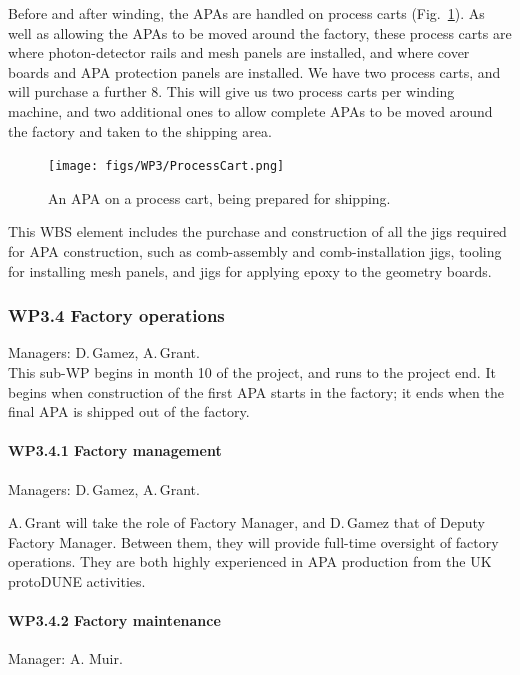 Before and after winding, the APAs are handled on process carts (Fig.~\ref{fig:ProcessCart}). As well as allowing the APAs to be moved around the factory, these process carts are where photon-detector rails and mesh panels are installed, and where cover boards and APA protection panels are installed. We have two process carts, and will purchase a further 8. This will give us two process carts per winding machine, and two additional ones to allow complete APAs to be moved around the factory and taken to the shipping area.

\begin{figure}
    \centering
    \texttt{[image: figs/WP3/ProcessCart.png]}
    \caption{An APA on a process cart, being prepared for shipping.}
    \label{fig:ProcessCart}
\end{figure}

This WBS element includes the purchase and construction of all the jigs required for APA construction, such as comb-assembly and comb-installation jigs, tooling for installing mesh panels, and jigs for applying epoxy to the geometry boards.

\subsubsection{WP3.4 Factory operations} Managers: D.\,Gamez, A.\,Grant.\\
This sub-WP begins in month 10 of the project, and runs to the project end. It begins when construction of the first APA starts in the factory; it ends when the final APA is shipped out of the factory.

\paragraph{WP3.4.1 Factory management} Managers: D.\,Gamez, A.\,Grant.

A.\,Grant will take the role of Factory Manager, and D.\,Gamez that of Deputy Factory Manager. Between them, they will provide full-time oversight of factory operations. They are both highly experienced in APA production from the UK protoDUNE activities.

\paragraph{WP3.4.2 Factory maintenance} Manager: A. Muir.


